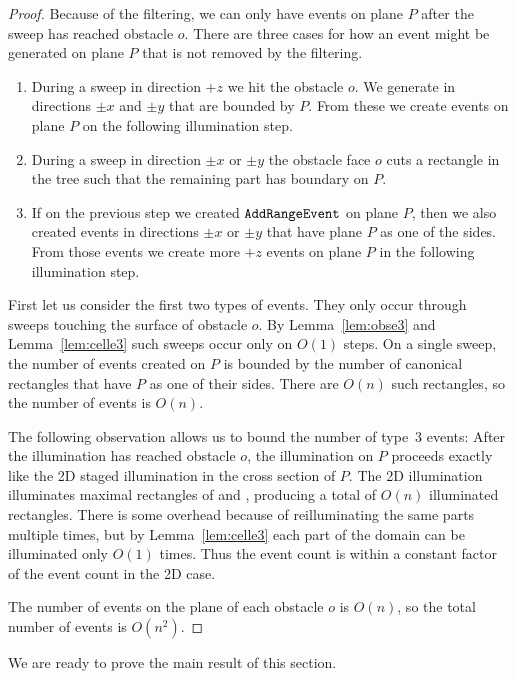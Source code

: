 \documentclass[english,gradu]{tktltiki2018}
\begin{document}
\begin{proof}
Because of the filtering, we can only have events on plane $P$ after the sweep has reached obstacle $o$.
There are three cases for how an event might be generated on plane $P$ that is not removed by the filtering.
\begin{enumerate}
\item During a sweep in direction $+z$ we hit the obstacle $o$.
	We generate \addEs in directions $\pm x$ and $\pm y$ that are bounded by $P$.
	From these \addEs we create events on plane $P$ on the following illumination step.
\item During a sweep in direction $\pm x$ or $\pm y$ the obstacle face $o$ cuts a rectangle in the tree such that the remaining part has boundary on $P$.
\item If on the previous step we created $\mathtt{AddRangeEvent}$ on plane $P$, then we also created events in directions $\pm x$ or $\pm y$ that have plane $P$ as one of the sides.
	From those events we create more $+z$ events on plane $P$ in the following illumination step.
\end{enumerate}

First let us consider the first two types of events.
They only occur through sweeps touching the surface of obstacle $o$.
By Lemma~\ref{lem:obse3} and Lemma~\ref{lem:celle3} such sweeps occur only on $O(1)$ steps.
On a single sweep, the number of events created on $P$ is bounded by the number of canonical rectangles that have $P$ as one of their sides.
There are $O(n)$ such rectangles, so the number of events is $O(n)$.

The following observation allows us to bound the number of type~3 events:
After the illumination has reached obstacle $o$, the illumination on $P$ proceeds exactly like the 2D staged illumination in the cross section of $P$.
The 2D illumination illuminates maximal rectangles of  and , producing a total of $O(n)$ illuminated rectangles.
There is some overhead because of reilluminating the same parts multiple times, but by Lemma~\ref{lem:celle3} each part of the domain can be illuminated only $O(1)$ times.
Thus the event count is within a constant factor of the event count in the 2D case.

The number of events on the plane of each obstacle $o$ is $O(n)$, so the total number of events is $O(n^2)$.
\end{proof}

We are ready to prove the main result of this section.
\end{document}
